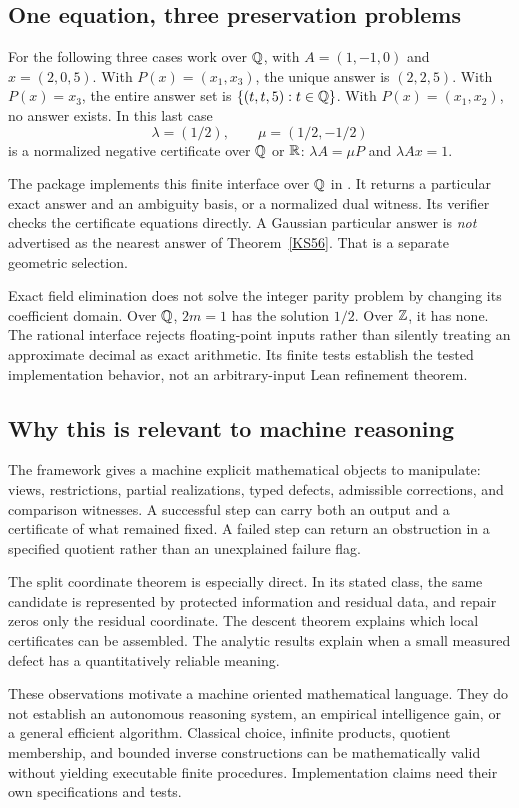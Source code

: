 \subsection{One equation, three preservation problems}
For the following three cases work over \(\mathbb Q\), with \(A=(1,-1,0)\) and \(x=(2,0,5)\). With \(P(x)=(x_1,x_3)\), the unique answer is \((2,2,5)\). With \(P(x)=x_3\), the entire answer set is \(\{(t,t,5):t\in\mathbb Q\}\). With \(P(x)=(x_1,x_2)\), no answer exists. In this last case
\[
 \lambda=(1/2),\qquad\mu=(1/2,-1/2)
\]
is a normalized negative certificate over \(\mathbb Q\) or \(\mathbb R\): \(\lambda A=\mu P\) and \(\lambda Ax=1\).

The package implements this finite interface over \(\mathbb Q\) in . It returns a particular exact answer and an ambiguity basis, or a normalized dual witness. Its verifier checks the certificate equations directly. A Gaussian particular answer is \emph{not} advertised as the nearest answer of Theorem~\ref{KS56}. That is a separate geometric selection.

Exact field elimination does not solve the integer parity problem by changing its coefficient domain. Over \(\mathbb Q\), \(2m=1\) has the solution \(1/2\). Over \(\mathbb Z\), it has none. The rational interface rejects floating-point inputs rather than silently treating an approximate decimal as exact arithmetic. Its finite tests establish the tested implementation behavior, not an arbitrary-input Lean refinement theorem.

\subsection{Why this is relevant to machine reasoning}
The framework gives a machine explicit mathematical objects to manipulate: views, restrictions, partial realizations, typed defects, admissible corrections, and comparison witnesses. A successful step can carry both an output and a certificate of what remained fixed. A failed step can return an obstruction in a specified quotient rather than an unexplained failure flag.

The split coordinate theorem is especially direct. In its stated class, the same candidate is represented by protected information and residual data, and repair zeros only the residual coordinate. The descent theorem explains which local certificates can be assembled. The analytic results explain when a small measured defect has a quantitatively reliable meaning.

These observations motivate a machine oriented mathematical language. They do not establish an autonomous reasoning system, an empirical intelligence gain, or a general efficient algorithm. Classical choice, infinite products, quotient membership, and bounded inverse constructions can be mathematically valid without yielding executable finite procedures. Implementation claims need their own specifications and tests.

